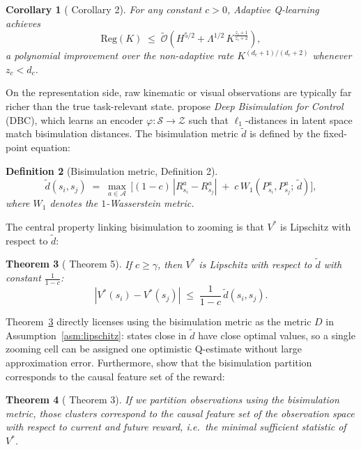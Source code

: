 \documentclass{article}
\newtheorem{theorem}{Theorem}
\newtheorem{corollary}[theorem]{Corollary}
\newtheorem{definition}[theorem]{Definition}
\begin{document}
\begin{corollary}[\citet{cao2021} Corollary 2]
\label{cor:zooming_regret}
For any constant $c>0$, Adaptive Q-learning achieves
\[
  \mathrm{Reg}(K) \;\le\;
  \tilde{\mathcal{O}}\!\left(H^{5/2} + \Lambda^{1/2}\,
    K^{\frac{z_c+1}{z_c+2}}\right),
\]
a polynomial improvement over the non-adaptive rate $K^{(d_c+1)/(d_c+2)}$ whenever
$z_c < d_c$.
\end{corollary}

On the representation side, raw kinematic or visual observations are typically far
richer than the true task-relevant state. \citet{zhang2021} propose \emph{Deep
Bisimulation for Control} (DBC), which learns an encoder $\varphi:\mathcal{S}\to
\mathcal{Z}$ such that $\ell_1$-distances in latent space match bisimulation
distances. The bisimulation metric $\tilde{d}$ is defined by the fixed-point equation:

\begin{definition}[Bisimulation metric, \citet{zhang2021} Definition 2]
\label{def:bisim}
\[
  \tilde{d}(s_i,s_j) \;=\; \max_{a\in\mathcal{A}}\,
    \bigl[(1-c)\,|R^a_{s_i} - R^a_{s_j}|
    \;+\; c\,W_1(P^a_{s_i}, P^a_{s_j};\,\tilde{d})\bigr],
\]
where $W_1$ denotes the $1$-Wasserstein metric.
\end{definition}

The central property linking bisimulation to zooming is that $V^*$ is Lipschitz with
respect to $\tilde{d}$:

\begin{theorem}[\citet{zhang2021} Theorem 5]
\label{thm:vlip}
If $c \ge \gamma$, then $V^*$ is Lipschitz with respect to $\tilde{d}$ with constant
$\frac{1}{1-c}$:
\[
  |V^*(s_i) - V^*(s_j)| \;\le\; \frac{1}{1-c}\,\tilde{d}(s_i, s_j).
\]
\end{theorem}

Theorem~\ref{thm:vlip} directly licenses using the bisimulation metric as the metric
$D$ in Assumption~\ref{asm:lipschitz}: states close in $\tilde{d}$ have close optimal
values, so a single zooming cell can be assigned one optimistic Q-estimate without
large approximation error. Furthermore, \citet{zhang2021} show that the bisimulation
partition corresponds to the causal feature set of the reward:

\begin{theorem}[\citet{zhang2021} Theorem 3]
\label{thm:causal}
If we partition observations using the bisimulation metric, those clusters correspond
to the causal feature set of the observation space with respect to current and future
reward, i.e.\ the minimal sufficient statistic of $V^*$.
\end{theorem}
\end{document}
